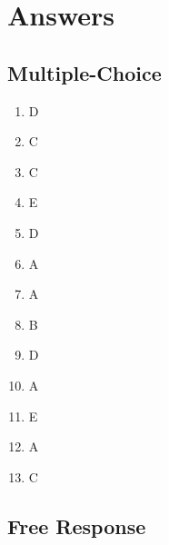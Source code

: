 \documentclass[11pt,addpoints]{exam}
\begin{document}
\section*{Answers}

\subsection*{Multiple-Choice}

\begin{enumerate}
  \item D
  \item C
  \item C
  \item E
  \item D
  \item A
  \item A
  \item B
  \item D
  \item A
  \item E
  \item A
  \item C
\end{enumerate}

\subsection*{Free Response}
\end{document}
